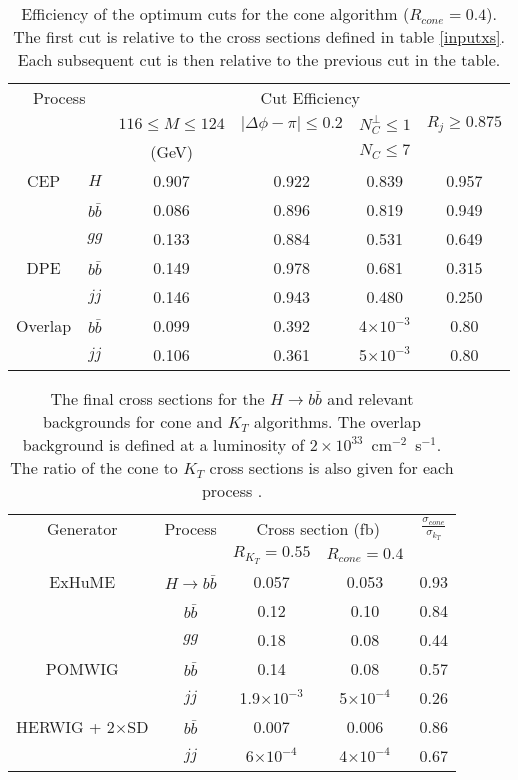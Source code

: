 \begin{table}[t]
\centering
\begin{tabular}{|cc|c|c|c|c|}
\hline
\multicolumn{2}{|c|}{Process} & \multicolumn{4}{c|}{Cut Efficiency} \\
\cline{3-6}
& & $116\leq M \leq 124$ & $|\Delta \phi - \pi|  \leq 0.2 $ & $N_C^{\perp} \leq 1$ & $R_j\geq0.875$\\
& & (GeV) & & $N_C \leq 7$ & \\
\hline
CEP & $H$ & 0.907 & 0.922 & 0.839 & 0.957  \\
 & $b\bar{b}$ & 0.086 & 0.896 & 0.819 & 0.949 \\
 & $gg$ & 0.133 & 0.884  & 0.531 & 0.649 \\
 \hline
DPE & $b\bar{b}$ & 0.149 & 0.978  & 0.681  & 0.315 \\
 & $jj$ & 0.146 & 0.943 & 0.480 & 0.250 \\ 
 \hline
Overlap & $b\bar{b}$ & 0.099 & 0.392 & 4$\times10^{-3}$  & 0.80 \\
& $jj$ & 0.106 & 0.361& 5$\times10^{-3}$& 0.80 \\
\hline
\end{tabular}
\caption[Efficiency of cuts for the cone algorithm ]{Efficiency of the optimum cuts for the cone algorithm ($R_{cone}=0.4$). The first cut is relative to the cross sections defined in table \ref{inputxs}. Each subsequent cut is then relative to the previous cut in the table.\label{conecuteff}}
\end{table}%



\begin{table}[t]
\centering
\begin{tabular}{|c|c|c|c|c|}
\hline
Generator & Process & \multicolumn{2}{c|}{Cross section (fb)} & $\frac{\sigma_{cone}}{\sigma_{k_T}}$\\
& & $R_{K_T}=0.55$ & $R_{cone}=0.4$ & \\
\hline
ExHuME & $H\rightarrow b\bar{b}$ & 0.057 & 0.053  & 0.93\\ %
 &$b\bar{b}$ & 0.12  & 0.10 & 0.84\\
 & $gg$ &  0.18 & 0.08 & 0.44\\ %
POMWIG & $b\bar{b}$ & 0.14 & 0.08 & 0.57 \\ %
& $jj$ & 1.9$\times10^{-3}$ & 5$\times10^{-4}$ & 0.26\\ %
HERWIG + 2$\times$SD & $b\bar{b}$ & 0.007 & 0.006 & 0.86\\ %
& $jj$ & 6$\times10^{-4}$ & 4$\times10^{-4}$&  0.67 \\     
\hline
\end{tabular}
\caption[Final cross sections for $H\rightarrow b\bar{b}$ and backgrounds]{The final cross sections for the $H\rightarrow b\bar{b}$ and relevant backgrounds for cone and $K_T$ algorithms. The overlap background is defined at a luminosity of $2\times10^{33}$~cm$^{-2}$~s$^{-1}$. The ratio of the cone to $K_T$  cross sections is also given for each process . \label{crosssectionfinal}}
\end{table}%

